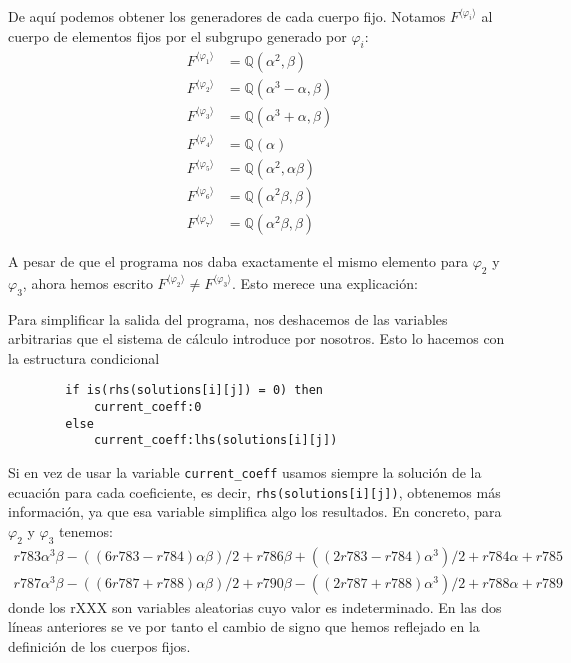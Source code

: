\documentclass[a4paper, 11pt]{article}
\begin{document}
\begin{solucion}
      De aquí podemos obtener los generadores de cada cuerpo fijo. Notamos $F^{\langle\varphi_i\rangle}$ al cuerpo de elementos fijos por el subgrupo generado por $\varphi_i$:
      \begin{align*}
          F^{\langle\varphi_1\rangle} &= \mathbb{Q}(\alpha^2,\beta) \\
          F^{\langle\varphi_2\rangle} &= \mathbb{Q}(\alpha^3-\alpha,\beta) \\
          F^{\langle\varphi_3\rangle} &= \mathbb{Q}(\alpha^3+\alpha,\beta) \\
          F^{\langle\varphi_4\rangle} &= \mathbb{Q}(\alpha) \\
          F^{\langle\varphi_5\rangle} &= \mathbb{Q}(\alpha^2,\alpha\beta) \\
          F^{\langle\varphi_6\rangle} &= \mathbb{Q}(\alpha^2\beta,\beta) \\
          F^{\langle\varphi_7\rangle} &= \mathbb{Q}(\alpha^2\beta,\beta)
      \end{align*}

      A pesar de que el programa nos daba exactamente el mismo elemento para $\varphi_2$ y $\varphi_3$, ahora hemos escrito $F^{\langle\varphi_2\rangle} \neq F^{\langle\varphi_3\rangle}$. Esto merece una explicación:

      Para simplificar la salida del programa, nos deshacemos de las variables arbitrarias que el sistema de cálculo introduce por nosotros. Esto lo hacemos con la estructura condicional
      \color{blue}
      \begin{verbatim}
        if is(rhs(solutions[i][j]) = 0) then
            current_coeff:0
        else
            current_coeff:lhs(solutions[i][j])
      \end{verbatim}
      \color{black}

      Si en vez de usar la variable \texttt{current\_coeff} usamos siempre la solución de la ecuación para cada coeficiente, es decir, \texttt{rhs(solutions[i][j])}, obtenemos más información, ya que esa variable simplifica algo los resultados. En concreto, para $\varphi_2$ y $\varphi_3$ tenemos:
      \color{blue}
      \begin{align*}
          r783\alpha^3\beta-((6r783-r784)\alpha\beta)/2+r786\beta+((2r783-r784)\alpha^3)/2+r784\alpha+r785 \\
          r787\alpha^3\beta-((6r787+r788)\alpha\beta)/2+r790\beta-((2r787+r788)\alpha^3)/2+r788\alpha+r789
      \end{align*}
      \color{black}
      donde los rXXX son variables aleatorias cuyo valor es indeterminado. En las dos líneas anteriores se ve por tanto el cambio de signo que hemos reflejado en la definición de los cuerpos fijos.


\end{solucion}
\end{document}
